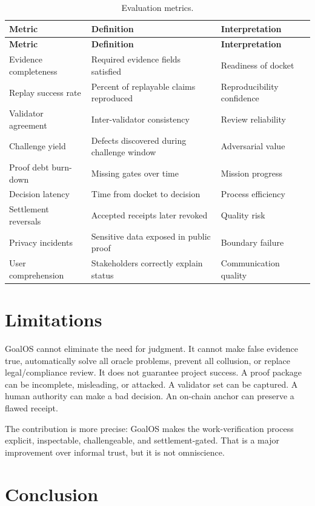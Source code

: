 \documentclass[11pt]{article}
\begin{document}
\begin{longtable}{p{} p{} p{}}
\caption{Evaluation metrics.}\label{tab:metrics}\\
\toprule
\textbf{Metric} & \textbf{Definition} & \textbf{Interpretation}\\
\midrule
\endfirsthead
\toprule
\textbf{Metric} & \textbf{Definition} & \textbf{Interpretation}\\
\midrule
\endhead
Evidence completeness & Required evidence fields satisfied & Readiness of docket \\
Replay success rate & Percent of replayable claims reproduced & Reproducibility confidence \\
Validator agreement & Inter-validator consistency & Review reliability \\
Challenge yield & Defects discovered during challenge window & Adversarial value \\
Proof debt burn-down & Missing gates over time & Mission progress \\
Decision latency & Time from docket to decision & Process efficiency \\
Settlement reversals & Accepted receipts later revoked & Quality risk \\
Privacy incidents & Sensitive data exposed in public proof & Boundary failure \\
User comprehension & Stakeholders correctly explain status & Communication quality \\
\bottomrule
\end{longtable}

\section{Limitations}

GoalOS cannot eliminate the need for judgment. It cannot make false evidence true, automatically solve all oracle problems, prevent all collusion, or replace legal/compliance review. It does not guarantee project success. A proof package can be incomplete, misleading, or attacked. A validator set can be captured. A human authority can make a bad decision. An on-chain anchor can preserve a flawed receipt.

The contribution is more precise: GoalOS makes the work-verification process explicit, inspectable, challengeable, and settlement-gated. That is a major improvement over informal trust, but it is not omniscience.

\section{Conclusion}
\end{document}
